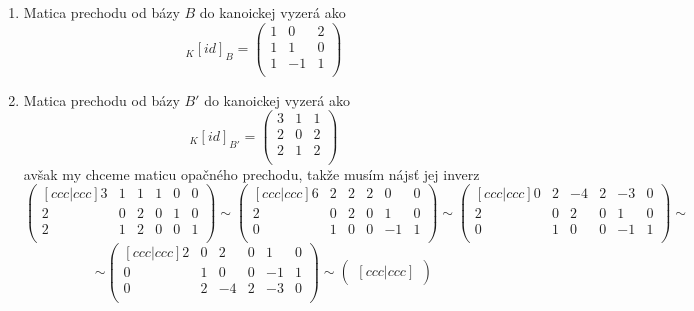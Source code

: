 
\begin{enumerate}
    \item Matica prechodu od bázy $B$ do kanoickej vyzerá ako 
    $${}_{K}[id]_{B}=
    \begin{pmatrix}
        1 & 0 & 2 \\
        1 & 1 & 0 \\
        1 & -1 & 1 \\
    \end{pmatrix}$$
    \item Matica prechodu od bázy $B'$ do kanoickej vyzerá ako
    $${}_{K}[id]_{B'}=
    \begin{pmatrix}
        3 & 1 & 1 \\
        2 & 0 & 2 \\
        2 & 1 & 2 \\
    \end{pmatrix}$$
    avšak my chceme maticu opačného prechodu, takže musím nájsť jej inverz
    \[\begin{pmatrix}[ccc|ccc]
        3 & 1 & 1 & 1 & 0 & 0 \\
        2 & 0 & 2 & 0 & 1 & 0 \\
        2 & 1 & 2 & 0 & 0 & 1 \\
      \end{pmatrix}
      \sim
      \begin{pmatrix}[ccc|ccc]
        6 & 2 & 2 & 2 & 0 & 0 \\
        2 & 0 & 2 & 0 & 1 & 0 \\
        0 & 1 & 0 & 0 & -1 & 1 \\
      \end{pmatrix}
      \sim
      \begin{pmatrix}[ccc|ccc]
        0 & 2 & -4 & 2 & -3 & 0 \\
        2 & 0 & 2 & 0 & 1 & 0 \\
        0 & 1 & 0 & 0 & -1 & 1 \\
      \end{pmatrix}
      \sim\]
    \[\sim
      \begin{pmatrix}[ccc|ccc]
        2 & 0 & 2 & 0 & 1 & 0 \\
        0 & 1 & 0 & 0 & -1 & 1 \\
        0 & 2 & -4 & 2 & -3 & 0 \\
      \end{pmatrix}
      \sim
      \begin{pmatrix}[ccc|ccc]

\end{pmatrix}\]
\end{enumerate}
